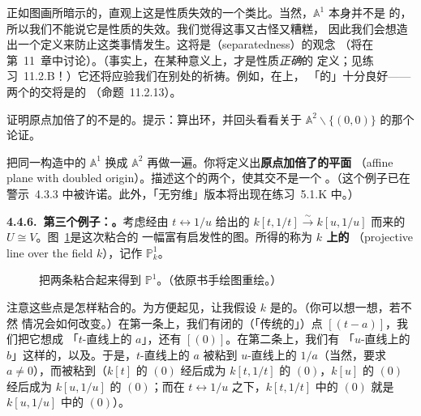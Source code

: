 正如图画所暗示的，直观上这是\trHausdorff{}性质失效的一个类比。当然，$\mathbb{A}^1$ 本身并不是%
\trHausdorff{}的，所以我们不能说它是\trHausdorff{}性质的失效。我们觉得这事又古怪又糟糕，%
因此我们会想造出一个定义来防止这类事情发生。这将是\emph{\trSeparatedness}（separatedness）的观念%
（将在第~11~章中讨论）。（事实上，在某种意义上，\trSeparatedness{}才是\trHausdorff{}性质\emph{正确}的%
定义；见练习~11.2.B！）它还将应验我们在别处的祈祷。例如，在\trSeparated{}\trScheme{}上，%
「\trZariskiTopology{}的\trAffine\trBase」十分良好——两个\trAffine\trOpenSet{}的交将是\trAffine{}的%
（命题~11.2.13）。

\begin{exercise}\label{ex:doubled-origin-line-not-affine}
证明原点加倍了的\trAffineLine{}不是\trAffine{}的。提示：算出\trGlobalSections{}环，并回头看看关于%
$\mathbb{A}^2\smallsetminus\{(0,0)\}$ 的那个论证。
\end{exercise}

\begin{exercise}[容易的练习]\label{ex:doubled-origin-plane}
把同一构造中的 $\mathbb{A}^1$ 换成 $\mathbb{A}^2$ 再做一遍。你将定义出\textbf{原点加倍了的\trAffine{}平面}%
（affine plane with doubled origin）。描述这个\trScheme{}的两个\trAffine\trOpenSubset，使其交不是一个%
\trAffine\trOpenSubset。（这个例子已在警示~4.3.3 中被许诺。此外，「无穷维」版本将出现在练习~5.1.K 中。）
\end{exercise}

\textbf{4.4.6.\ 第三个例子：\trProjectiveLine{}。}\quad 考虑经由 $t\leftrightarrow 1/u$ 给出的\trIsomorphism{}%
$k[t,1/t]\overset{\sim}{\longrightarrow}k[u,1/u]$ 而来的 $U\cong V$。图~\ref{fig:gluing-p1}是这次粘合的%
一幅富有启发性的图。所得的\trScheme{}称为\textbf{\trField{} $k$ 上的\trProjectiveLine{}}%
（projective line over the field $k$），记作 $\mathbb{P}^1_k$。

\begin{figure}[htbp]
\centering
{}
\caption{把两条\trAffineLine{}粘合起来得到 $\mathbb{P}^1$。（依原书手绘图重绘。）}%
\label{fig:gluing-p1}
\end{figure}

注意这些点是怎样粘合的。为方便起见，让我假设 $k$ 是\trAlgClosed{}的。（你可以想一想，若不然%
情况会如何改变。）在第一条\trAffineLine{}上，我们有闭的（「传统的」）点 $[(t-a)]$，我们把它想成%
「$t$-直线上的 $a$」，还有\trGenericPoint{} $[(0)]$。在第二条\trAffineLine{}上，我们有%
「$u$-直线上的 $b$」这样的\trClosedPoint，以及\trGenericPoint。于是，$t$-直线上的 $a$ 被粘到%
$u$-直线上的 $1/a$（当然，要求 $a\neq 0$），而\trGenericPoint{}被粘到\trGenericPoint（$k[t]$ 的%
\trIdeal{} $(0)$ 经\trLocalization{}后成为 $k[t,1/t]$ 的\trIdeal{} $(0)$，$k[u]$ 的\trIdeal{} $(0)$%
经\trLocalization{}后成为 $k[u,1/u]$ 的\trIdeal{} $(0)$；而在\trIsomorphism{} $t\longleftrightarrow 1/u$
之下，$k[t,1/t]$ 中的 $(0)$ 就是 $k[u,1/u]$ 中的 $(0)$）。


